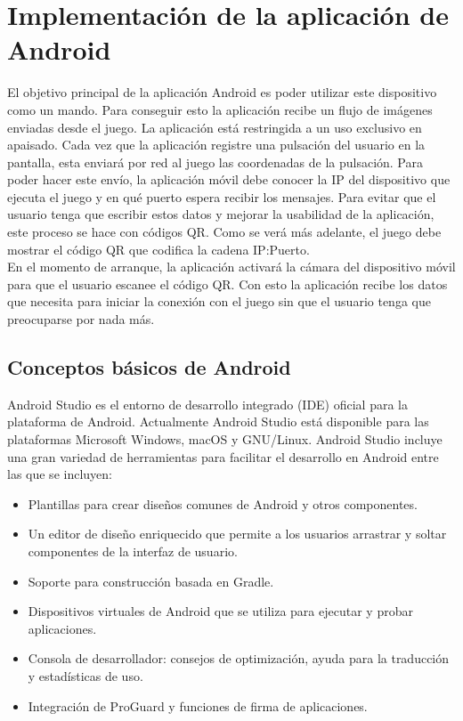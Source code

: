 \section{Implementaci\'on de la aplicaci\'on de Android}
\label{android}

El objetivo principal de la aplicaci\'on Android es poder utilizar este dispositivo como un mando. Para conseguir esto la aplicaci\'on recibe un flujo de im\'agenes enviadas desde el juego. La aplicaci\'on est\'a restringida a un uso exclusivo en apaisado. Cada vez que la aplicaci\'on registre una pulsaci\'on del usuario en la pantalla, esta enviar\'a por red al juego las coordenadas de la pulsaci\'on. Para poder hacer este env\'io, la aplicaci\'on m\'ovil debe conocer la IP del dispositivo que ejecuta el juego y en qu\'e puerto espera recibir los mensajes. Para evitar que el usuario tenga que escribir estos datos y mejorar la usabilidad de la aplicaci\'on, este proceso se hace con c\'odigos QR. Como se ver\'a m\'as adelante, el juego debe mostrar el c\'odigo QR que codifica la cadena IP:Puerto.\\

En el momento de arranque, la aplicaci\'on activar\'a la c\'amara del dispositivo m\'ovil para que el usuario escanee el c\'odigo QR. Con esto la aplicaci\'on recibe los datos que necesita para iniciar la conexi\'on con el juego sin que el usuario tenga que preocuparse por nada m\'as.

\subsection {Conceptos b\'asicos de Android}

Android Studio es el entorno de desarrollo integrado (IDE) oficial para la plataforma de Android. Actualmente Android Studio est\'a disponible para las plataformas Microsoft Windows, macOS y GNU/Linux. Android Studio incluye una gran variedad de herramientas para facilitar el desarrollo en Android entre las que se incluyen:

\begin {itemize}
\item Plantillas para crear dise\~nos comunes de Android y otros componentes.
\item Un editor de dise\~no enriquecido que permite a los usuarios arrastrar y soltar componentes de la interfaz de usuario.
\item Soporte para construcci\'on basada en Gradle.
\item Dispositivos virtuales de Android que se utiliza para ejecutar y probar aplicaciones.
\item Consola de desarrollador: consejos de optimizaci\'on, ayuda para la traducci\'on y estad\'isticas de uso.
\item Integraci\'on de ProGuard y funciones de firma de aplicaciones.
\end {itemize}
 
